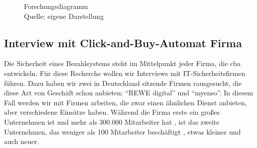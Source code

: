 \begin{figure}[H]
  \caption{Forschungsdiagramm
  \\ Quelle: eigene Darstellung}
  \label{fig:FD}
\end{figure}



\subsection{Interview mit Click-and-Buy-Automat Firma}

Die Sicherheit eines Bezahlsystems steht im Mittelpunkt jeder Firma, die \acrfull{cba} entwickeln. Für diese Recherche wollen
wir Interviews mit IT-Sicherheitsfirmen führen. Dazu haben wir zwei in Deutschland sitzende Firmen rausgesucht, 
die diese Art von Geschäft schon anbieten: ``REWE digital'' und ``myenso''. In diesem Fall werden wir mit Firmen arbeiten, 
die zwar einen ähnlichen Dienst anbieten, aber verschiedene Einsätze haben. Während die Firma erste ein großes Unternehmen
ist und mehr als 300.000 Mitarbeiter hat \cite{refst:REWE}, ist das zweite Unternehmen, das weniger
als 100 Mitarbeiter beschäftigt \cite{refst:MYENSO}, etwas kleiner und auch neuer.

